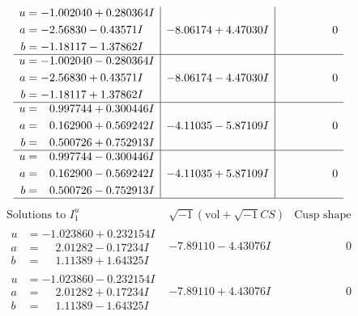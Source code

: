 \documentclass[1p]{elsarticle_modified}
\theoremstyle{definition}
\newcommand{\I}{\sqrt{-1}}
\begin{document}
$$\begin{array}{c|c|c}
\begin{aligned}
u &= -1.002040 + 0.280364 I \\
a &= -2.56830 - 0.43571 I \\
b &= -1.18117 - 1.37862 I\end{aligned}
 & -8.06174 + 4.47030 I & \phantom{-0.000000 } 0 \\ \hline\begin{aligned}
u &= -1.002040 - 0.280364 I \\
a &= -2.56830 + 0.43571 I \\
b &= -1.18117 + 1.37862 I\end{aligned}
 & -8.06174 - 4.47030 I & \phantom{-0.000000 } 0 \\ \hline\begin{aligned}
u &= \phantom{-}0.997744 + 0.300446 I \\
a &= \phantom{-}0.162900 + 0.569242 I \\
b &= \phantom{-}0.500726 + 0.752913 I\end{aligned}
 & -4.11035 - 5.87109 I & \phantom{-0.000000 } 0 \\ \hline\begin{aligned}
u &= \phantom{-}0.997744 - 0.300446 I \\
a &= \phantom{-}0.162900 - 0.569242 I \\
b &= \phantom{-}0.500726 - 0.752913 I\end{aligned}
 & -4.11035 + 5.87109 I & \phantom{-0.000000 } 0\\
 \hline 
 \end{array}$$\newpage$$\begin{array}{c|c|c}  
\text{Solutions to }I^u_{1}& \I (\text{vol} + \sqrt{-1}CS) & \text{Cusp shape}\\
 \hline 
\begin{aligned}
u &= -1.023860 + 0.232154 I \\
a &= \phantom{-}2.01282 - 0.17234 I \\
b &= \phantom{-}1.11389 + 1.64325 I\end{aligned}
 & -7.89110 - 4.43076 I & \phantom{-0.000000 } 0 \\ \hline\begin{aligned}
u &= -1.023860 - 0.232154 I \\
a &= \phantom{-}2.01282 + 0.17234 I \\
b &= \phantom{-}1.11389 - 1.64325 I\end{aligned}
 & -7.89110 + 4.43076 I & \phantom{-0.000000 } 0 \\ \hline\begin{aligned}

\end{aligned}
\end{array}$$
\end{document}
